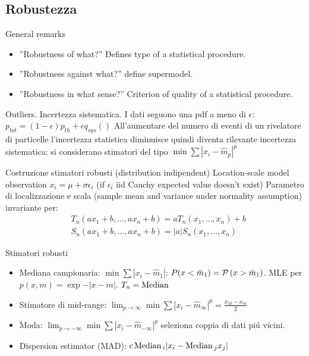 \documentclass[asd-beamer.tex]{subfiles}%
\begin{document}
\subsection{Robustezza}

\begin{frame}{General remarks}
\begin{itemize}
\item ''Robustness of what?'' Defines type of a statistical procedure.
\item ''Robustness against what?'' define supermodel.
\item ''Robustness in what sense?'' Criterion of quality of a statistical procedure.
\end{itemize}
\end{frame}

\begin{frame}{Outliers. Incertezza sistematica.}
I dati seguono una pdf a meno di $\epsilon$: $p_{tot}=(1-\epsilon)p_{th}+\epsilon q_{sys}()$
All'aumentare del numero di eventi di un rivelatore di particelle l'incertezza statistica diminuisce quindi diventa rilevante incertezza sistematica: si considerano stimatori del tipo $\min\sum|x_i-\hat{m}_p|^p$
\begin{block}{Costruzione stimatori robusti (distribution indipendent)}
Location-scale model observation $x_i=\mu+\sigma\epsilon_i$ (if $\epsilon_i$ iid Cauchy expected value doesn't exist)
Parametro di localizzazione e scala (sample mean and variance under normality assumption) invariante per:
\begin{align*}
&T_n(ax_1+b,\ldots,ax_n+b)=aT_n(x_1,\ldots,x_n)+b\\
&S_n(ax_1+b,\ldots,ax_n+b)=|a|S_n(x_1,\ldots,x_n)
\end{align*}
\end{block}
\end{frame}

\begin{frame}{Stimatori robusti}
\begin{itemize}
\item Mediana campionaria: $\min\sum|x_i-\hat{m}_1|$: $P(x<\hat{m}_1)=\operatorname{\mathcal{P}}{(x>\hat{m}_1)}$. MLE per $p(x,m)=\exp{-|x-m|}$. $T_n=\operatorname{Median}{}$
\item Stimatore di mid-range: $\lim_{p\to\infty}\min\sum|x_i-\hat{m}_{\infty}|^p=\frac{x_M-x_m}{2}$
\item Moda:	$\lim_{p\to-\infty}\min\sum|x_i-\hat{m}_{-\infty}|^p$ seleziona coppia di dati pi\'u vicini.
\item Dispersion estimator (MAD): $c\operatorname{Median}{}_i|x_i-\operatorname{Median}{}_jx_j|$
\end{itemize}
\end{frame}
\end{document}
